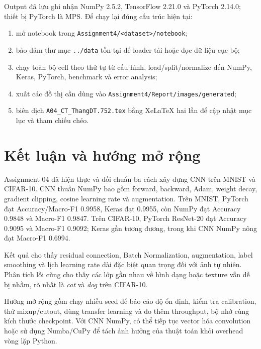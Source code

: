 \documentclass[12pt,a4paper]{report}
\newcommand{\modelpath}[1]{\texttt{#1}}
\begin{document}
Output đã lưu ghi nhận NumPy 2.5.2, TensorFlow 2.21.0 và PyTorch 2.14.0; thiết
bị PyTorch là MPS. Để chạy lại đúng cấu trúc hiện tại:
\begin{enumerate}
    \item mở notebook trong \modelpath{Assignment4/<dataset>/notebook};
    \item bảo đảm thư mục \modelpath{../data} tồn tại để loader tải hoặc đọc dữ
    liệu cục bộ;
    \item chạy toàn bộ cell theo thứ tự từ cấu hình, load/split/normalize đến
    NumPy, Keras, PyTorch, benchmark và error analysis;
    \item xuất các đồ thị cần dùng vào
    \modelpath{Assignment4/Report/images/generated};
    \item biên dịch \modelpath{A04\_CT\_ThangDT.752.tex} bằng XeLaTeX hai lần để
    cập nhật mục lục và tham chiếu chéo.
\end{enumerate}

\section{Kết luận và hướng mở rộng}
Assignment 04 đã hiện thực và đối chuẩn ba cách xây dựng CNN trên MNIST và
CIFAR-10. CNN thuần NumPy bao gồm forward, backward, Adam, weight decay,
gradient clipping, cosine learning rate và augmentation. Trên MNIST, PyTorch
đạt Accuracy/Macro-F1 0.9958, Keras đạt 0.9955, còn NumPy đạt Accuracy 0.9848
và Macro-F1 0.9847. Trên CIFAR-10, PyTorch ResNet-20 đạt Accuracy 0.9095 và
Macro-F1 0.9092; Keras gần tương đương, trong khi CNN NumPy nông đạt Macro-F1
0.6994.

Kết quả cho thấy residual connection, Batch Normalization, augmentation, label
smoothing và lịch learning rate dài đặc biệt quan trọng đối với ảnh tự nhiên.
Phân tích lỗi cũng cho thấy các lớp gần nhau về hình dạng hoặc texture vẫn dễ bị
nhầm, rõ nhất là \textit{cat} và \textit{dog} trên CIFAR-10.

Hướng mở rộng gồm chạy nhiều seed để báo cáo độ ổn định, kiểm tra calibration,
thử mixup/cutout, dùng transfer learning và đo thêm throughput, bộ nhớ cùng kích
thước checkpoint. Với CNN NumPy, có thể tiếp tục vector hóa convolution hoặc sử
dụng Numba/CuPy để tách ảnh hưởng của thuật toán khỏi overhead vòng lặp Python.
\end{document}
